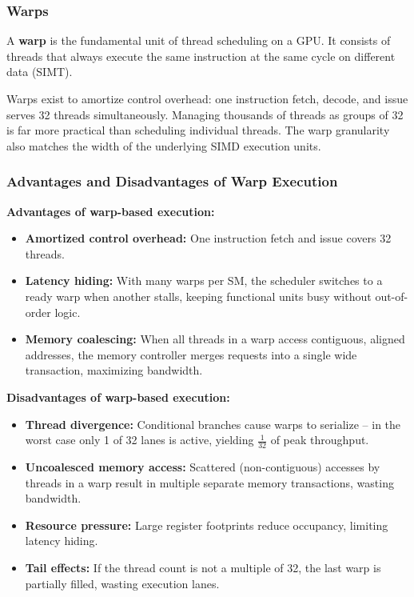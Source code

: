 \subsubsection{Warps}

\begin{definition}
	A \textbf{warp} is the fundamental unit of thread scheduling on a GPU. It consists of threads that always execute the same instruction at the same cycle on different data (SIMT).
\end{definition}

\begin{remark}
	Warps exist to amortize control overhead: one instruction fetch, decode, and issue serves 32 threads simultaneously. Managing thousands of threads as groups of 32 is far more practical than scheduling individual threads. The warp granularity also matches the width of the underlying SIMD execution units.
\end{remark}

\subsubsection{Advantages and Disadvantages of Warp Execution}

\begin{theorem}
	\textbf{Advantages of warp-based execution:}
	\begin{itemize}
		\item \textbf{Amortized control overhead:} One instruction fetch and issue covers 32 threads.
		\item \textbf{Latency hiding:} With many warps per SM, the scheduler switches to a ready warp when another stalls, keeping functional units busy without out-of-order logic.
		\item \textbf{Memory coalescing:} When all threads in a warp access contiguous, aligned addresses, the memory controller merges requests into a single wide transaction, maximizing bandwidth.
	\end{itemize}
\end{theorem}

\begin{theorem}
	\textbf{Disadvantages of warp-based execution:}
	\begin{itemize}
		\item \textbf{Thread divergence:} Conditional branches cause warps to serialize -- in the worst case only 1 of 32 lanes is active, yielding $\frac{1}{32}$ of peak throughput.
		\item \textbf{Uncoalesced memory access:} Scattered (non-contiguous) accesses by threads in a warp result in multiple separate memory transactions, wasting bandwidth.
		\item \textbf{Resource pressure:} Large register footprints reduce occupancy, limiting latency hiding.
		\item \textbf{Tail effects:} If the thread count is not a multiple of 32, the last warp is partially filled, wasting execution lanes.
	\end{itemize}
\end{theorem}


